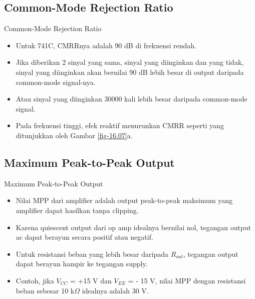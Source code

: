 \subsection{Common-Mode Rejection Ratio}

\begin{frame}{Common-Mode Rejection Ratio}
	\begin{itemize}
		\item Untuk 741C, CMRRnya adalah 90 dB di frekuensi rendah.
		\item Jika diberikan 2 sinyal yang sama, sinyal yang diinginkan dan yang tidak, sinyal yang diinginkan akan bernilai 90 dB lebih besar di output daripada common-mode signal-nya.
		\item Atau sinyal yang diinginkan 30000 kali lebih besar daripada common-mode signal.
		\item Pada frekuensi tinggi, efek reaktif menurunkan CMRR seperti yang ditunjukkan oleh Gambar \ref{fig-16.07}a.
	\end{itemize}
\end{frame}

\subsection{Maximum Peak-to-Peak Output}

\begin{frame}{Maximum Peak-to-Peak Output}
	\begin{itemize}
		\item Nilai MPP dari amplifier adalah output peak-to-peak maksimum yang amplifier dapat hasilkan tanpa clipping.
		\item Karena quiescent output dari op amp idealnya bernilai nol, tegangan output ac dapat berayun secara positif atau negatif.
		\item Untuk resistansi beban yang lebih besar daripada $ R_{out} $, tegangan output dapat berayun hampir ke tegangan supply.
		\item Contoh, jika $ V_{CC} $ = +15 V dan $ V_{EE} $ = - 15 V, nilai MPP dengan resistansi beban sebesar 10 k$ \Omega $ idealnya adalah 30 V.
	\end{itemize}
\end{frame}

